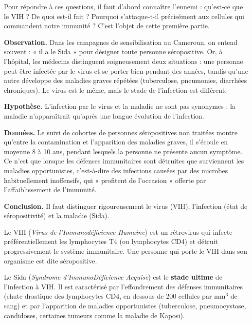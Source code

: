 \documentclass[11pt]{article}
\newcommand{\cle}[1]{{\popxbold\color{popdark}#1}}
\newcounter{popsec}
\newcounter{popsub}
\newcommand{\courssub}[1]{%
  \stepcounter{popsub}%
  \par\vspace{9pt}\noindent{\popxbold\fontsize{11.5}{13}\selectfont\color{popink}{\color{poporange}\thepopsec.\thepopsub}\hspace{6pt}#1}\par\nopagebreak\vspace{4pt}
}
\begin{document}
Pour répondre à ces questions, il faut d'abord connaître l'ennemi : qu'est-ce que le VIH ? De quoi est-il fait ? Pourquoi s'attaque-t-il précisément aux cellules qui commandent notre immunité ? C'est l'objet de cette première partie.

\courssub{VIH et Sida : deux notions à ne pas confondre}

\textbf{Observation.} Dans les campagnes de sensibilisation au Cameroun, on entend souvent : « il a le Sida » pour désigner toute personne séropositive. Or, à l'hôpital, les médecins distinguent soigneusement deux situations : une personne peut être infectée par le virus et se porter bien pendant des années, tandis qu'une autre développe des maladies graves répétées (tuberculose, pneumonies, diarrhées chroniques). Le virus est le même, mais le stade de l'infection est différent.

\textbf{Hypothèse.} L'infection par le virus et la maladie ne sont pas synonymes : la maladie n'apparaîtrait qu'après une longue évolution de l'infection.

\textbf{Données.} Le suivi de cohortes de personnes séropositives non traitées montre qu'entre la contamination et l'apparition des maladies graves, il s'écoule en moyenne 8 à 10 ans, pendant lesquels la personne ne présente aucun symptôme. Ce n'est que lorsque les défenses immunitaires sont détruites que surviennent les \cle{maladies opportunistes}, c'est-à-dire des infections causées par des microbes habituellement inoffensifs, qui « profitent de l'occasion » offerte par l'affaiblissement de l'immunité.

\textbf{Conclusion.} Il faut distinguer rigoureusement le virus (VIH), l'infection (état de séropositivité) et la maladie (Sida).

\begin{definition}[Le VIH]
Le \cle{VIH} (\emph{Virus de l'Immunodéficience Humaine}) est un \cle{rétrovirus} qui infecte préférentiellement les \cle{lymphocytes T4} (ou lymphocytes CD4) et détruit progressivement le système immunitaire. Une personne qui porte le VIH dans son organisme est dite \cle{séropositive}.
\end{definition}

\begin{definition}[Le Sida]
Le \cle{Sida} (\emph{Syndrome d'ImmunoDéficience Acquise}) est le \textbf{stade ultime} de l'infection à VIH. Il est caractérisé par l'effondrement des défenses immunitaires (chute drastique des lymphocytes CD4, en dessous de 200 cellules par mm$^3$ de sang) et par l'apparition de maladies opportunistes (tuberculose, pneumocystose, candidoses, certaines tumeurs comme la maladie de Kaposi).
\end{definition}
\end{document}
